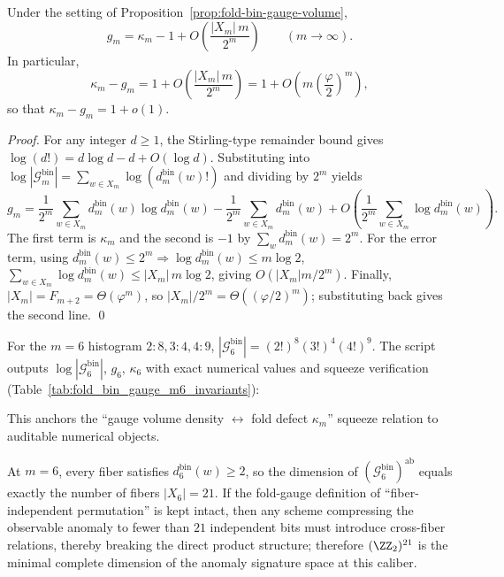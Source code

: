 \begin{theorem}\label{thm:fold-bin-gauge-volume-stirling}
Under the setting of Proposition~\ref{prop:fold-bin-gauge-volume},
\[
g_m=\kappa_m-1+O\!\left(\frac{|X_m|\,m}{2^m}\right)\qquad(m\to\infty).
\]
In particular,
\[
\kappa_m-g_m
=1+O\!\left(\frac{|X_m|\,m}{2^m}\right)
=1+O\!\left(m\left(\frac{\varphi}{2}\right)^m\right),
\]
so that \(\kappa_m-g_m=1+o(1)\).
\end{theorem}
\begin{proof}
For any integer \(d\ge 1\), the Stirling-type remainder bound gives
\(
\log(d!)=d\log d-d+O(\log d)
\).
Substituting into
\(
\log|\mathcal{G}^{\mathrm{bin}}_m|
=\sum_{w\in X_m}\log(d^{\mathrm{bin}}_m(w)!)
\)
and dividing by \(2^m\) yields
\[
g_m
=\frac{1}{2^m}\sum_{w\in X_m}d^{\mathrm{bin}}_m(w)\log d^{\mathrm{bin}}_m(w)
-\frac{1}{2^m}\sum_{w\in X_m}d^{\mathrm{bin}}_m(w)
 +O\!\left(\frac{1}{2^m}\sum_{w\in X_m}\log d^{\mathrm{bin}}_m(w)\right).
\]
The first term is \(\kappa_m\) and the second is \(-1\) by \(\sum_w d^{\mathrm{bin}}_m(w)=2^m\).
For the error term, using \(d^{\mathrm{bin}}_m(w)\le 2^m\Rightarrow \log d^{\mathrm{bin}}_m(w)\le m\log 2\),
\(
\sum_{w\in X_m}\log d^{\mathrm{bin}}_m(w)\le |X_m|\,m\log 2
\),
giving \(O(|X_m|m/2^m)\).
Finally, \(|X_m|=F_{m+2}=\Theta(\varphi^m)\), so \(|X_m|/2^m=\Theta((\varphi/2)^m)\); substituting back gives the second line. \qed
\end{proof}

\begin{remark}[Numerical anchor for the gauge volume at \texorpdfstring{$m=6$}{m=6}]\label{rem:fold-bin-gauge-volume-m6}
For the \(m=6\) histogram \(2:8,3:4,4:9\),
\(
|\mathcal{G}^{\mathrm{bin}}_6|=(2!)^{8}(3!)^{4}(4!)^{9}
\).
The script \texttt{} outputs
\(\log|\mathcal{G}^{\mathrm{bin}}_6|\), \(g_6\), \(\kappa_6\) with exact numerical values and squeeze verification (Table~\ref{tab:fold_bin_gauge_m6_invariants}):

This anchors the ``gauge volume density \(\leftrightarrow\) fold defect \(\kappa_m\)'' squeeze relation to auditable numerical objects.
\end{remark}

\begin{remark}[Incompressibility of the anomaly signature dimension (\texorpdfstring{$m=6$}{m=6})]\label{rem:fold-bin-gauge-rigidity}
At \(m=6\), every fiber satisfies \(d^{\mathrm{bin}}_6(w)\ge 2\),
so the dimension of \((\mathcal{G}^{\mathrm{bin}}_6)^{\mathrm{ab}}\) equals exactly the number of fibers \(|X_6|=21\).
If the fold-gauge definition of ``fiber-independent permutation'' is kept intact, then any scheme compressing the observable anomaly to fewer than \(21\) independent bits
must introduce cross-fiber relations, thereby breaking the direct product structure;
therefore \((\ZZ_2)^{21}\) is the minimal complete dimension of the anomaly signature space at this caliber.
\end{remark}

